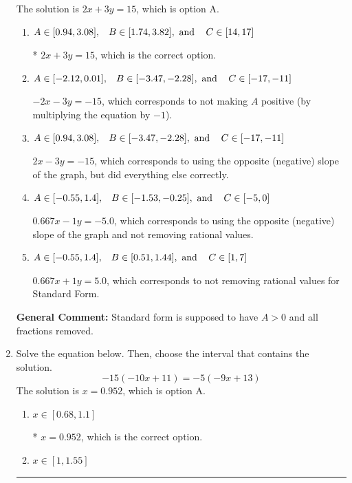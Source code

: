 \documentclass{extbook}[14pt]
\newcommand{\litem}[1]{\item #1

\rule{\textwidth}{0.4pt}}
\begin{document}
\begin{enumerate}
{The solution is \( 2x + 3y = 15 \), which is option A.\begin{enumerate}[label=\Alph*.]
\item \( A \in [0.94, 3.08], \hspace{3mm} B \in [1.74, 3.82], \text{ and } \hspace{3mm} C \in [14, 17] \)

* $2x + 3y = 15$, which is the correct option.
\item \( A \in [-2.12, 0.01], \hspace{3mm} B \in [-3.47, -2.28], \text{ and } \hspace{3mm} C \in [-17, -11] \)

 $-2x - 3y = -15$, which corresponds to not making $A$ positive (by multiplying the equation by $-1$).
\item \( A \in [0.94, 3.08], \hspace{3mm} B \in [-3.47, -2.28], \text{ and } \hspace{3mm} C \in [-17, -11] \)

 $2x - 3y = -15$, which corresponds to using the opposite (negative) slope of the graph, but did everything else correctly.
\item \( A \in [-0.55, 1.4], \hspace{3mm} B \in [-1.53, -0.25], \text{ and } \hspace{3mm} C \in [-5, 0] \)

 $0.667x - 1y = -5.0$, which corresponds to using the opposite (negative) slope of the graph and not removing rational values.
\item \( A \in [-0.55, 1.4], \hspace{3mm} B \in [0.51, 1.44], \text{ and } \hspace{3mm} C \in [1, 7] \)

 $0.667x + 1y = 5.0$, which corresponds to not removing rational values for Standard Form.
\end{enumerate}

\textbf{General Comment:} Standard form is supposed to have $A > 0$ and all fractions removed.
}
\litem{
Solve the equation below. Then, choose the interval that contains the solution.
\[ -15(-10x + 11) = -5(-9x + 13) \]The solution is \( x = 0.952 \), which is option A.\begin{enumerate}[label=\Alph*.]
\item \( x \in [0.68, 1.1] \)

* $x = 0.952$, which is the correct option.
\item \( x \in [1, 1.55] \)


\end{enumerate}}
\end{enumerate}
\end{document}
